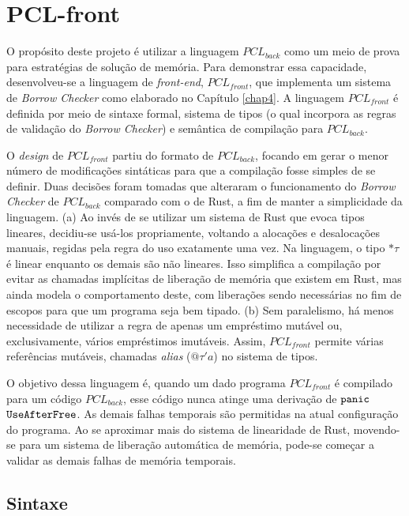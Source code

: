 \chapter{PCL-front}
\label{chap5}

O propósito deste projeto é utilizar a linguagem $PCL_{back}$ como um meio de prova para estratégias de solução de memória. Para demonstrar essa capacidade, desenvolveu-se a linguagem de \emph{front-end}, $PCL_{front}$, que implementa um sistema de \emph{Borrow Checker} como elaborado no Capítulo \ref{chap4}. A linguagem $PCL_{front}$ é definida por meio de sintaxe formal, sistema de tipos (o qual incorpora as regras de validação do \emph{Borrow Checker}) e semântica de compilação para $PCL_{back}$.

O \emph{design} de $PCL_{front}$ partiu do formato de $PCL_{back}$, focando em gerar o menor número de modificações sintáticas para que a compilação fosse simples de se definir. Duas decisões foram tomadas que alteraram o funcionamento do \emph{Borrow Checker} de $PCL_{back}$ comparado com o de Rust, a fim de manter a simplicidade da linguagem. (a) Ao invés de se utilizar um sistema de Rust que evoca tipos lineares, decidiu-se usá-los propriamente, voltando a alocações e desalocações manuais, regidas pela regra do uso exatamente uma vez. Na linguagem, o tipo $\text{*}\tau$ é linear enquanto os demais são não lineares. Isso simplifica a compilação por evitar as chamadas implícitas de liberação de memória que existem em Rust, mas ainda modela o comportamento deste, com liberações sendo necessárias no fim de escopos para que um programa seja bem tipado. (b) Sem paralelismo, há menos necessidade de utilizar a regra de apenas um empréstimo mutável ou, exclusivamente, vários empréstimos imutáveis. Assim, $PCL_{front}$ permite várias referências mutáveis, chamadas \emph{alias} ($@\tau'a$) no sistema de tipos. 

O objetivo dessa linguagem é, quando um dado programa $PCL_{front}$ é compilado para um código $PCL_{back}$, esse código nunca atinge uma derivação de $\texttt{panic}$ $\texttt{UseAfterFree}$. As demais falhas temporais são permitidas na atual configuração do programa. Ao se aproximar mais do sistema de linearidade de Rust, movendo-se para um sistema de liberação automática de memória, pode-se começar a validar as demais falhas de memória temporais.

\section{Sintaxe}

